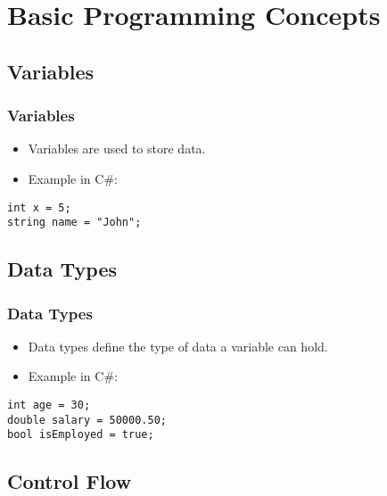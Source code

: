 \section{Basic Programming Concepts}

\subsection{Variables}
\begin{frame}[fragile]
\frametitle{Variables}
\begin{itemize}
    \item Variables are used to store data.
    \item Example in C\#:
\end{itemize}
\begin{lstlisting}
int x = 5;
string name = "John";
\end{lstlisting}
\end{frame}

\subsection{Data Types}
\begin{frame}[fragile]
\frametitle{Data Types}
\begin{itemize}
    \item Data types define the type of data a variable can hold.
    \item Example in C\#:
\end{itemize}
\begin{lstlisting}
int age = 30;
double salary = 50000.50;
bool isEmployed = true;
\end{lstlisting}
\end{frame}

\subsection{Control Flow}
